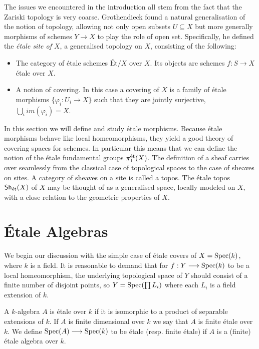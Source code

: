 The issues we encountered in the introduction all stem from the fact that the Zariski topology is very coarse. Grothendieck found a natural generalisation of the notion of topology, allowing not only open subsets $U \subseteq X$ but more generally morphisms of schemes $Y \to X$ to play the role of open set. Specifically, he defined the \textit{\'etale site of $X$}, a generalised topology on $X$, consisting of the following:

\begin{itemize}
  \item The category of \'etale schemes $\text{\'Et}/X$ over $X$. Its objects are schemes $f:S \to X$ \'etale over $X$. 
  \item A notion of covering. In this case a covering of $X$ is a family of \'etale morphisms $\{\varphi_i: U_i \to X\}$ such that they are jointly surjective, $\bigcup_i im(\varphi_i) = X$. 
\end{itemize}

In this section we will define and study \'etale morphisms.  Because \'etale morphisms behave like local homeomorphisms, they yield a good theory of covering spaces for schemes. In particular this means that we can define the notion of the \'etale fundamental groups $\pi_1^{\text{\'et}}(X)$. The definition of a sheaf carries over seamlessly from the classical case of topological spaces to the case of sheaves on sites. A category of sheaves on a site is called a topos.  The \'etale topos $\mathsf{Sh}_{\text{\'et}}(X)$ of $X$ may be thought of as a generalised space, locally modeled on $X$, with a close relation to the geometric properties of $X$. 

\section{\'Etale Algebras}
We begin our discussion with the simple case of \'etale covers of $X = \operatorname{Spec}(k)$, where $k$ is a field. It is reasonable to demand that for $f: Y \longrightarrow \operatorname{Spec}(k)$ to be a local homeomorphism, the underlying topological space of $Y$ should consist of a finite number of disjoint points, so $Y = \operatorname{Spec}(\prod L_i)$ where each $L_i$ is a field extension of $k$. 

\begin{definition}
  A $k$-algebra $A$ is \'etale over $k$ if it is isomorphic to a product of separable extensions of $k$. If $A$ is finite dimensional over $k$ we say that $A$ is finite \'etale over $k$. We define $\operatorname{Spec}(A) \longrightarrow \operatorname{Spec}(k)$ to be \'etale (resp. finite \'etale) if $A$ is a (finite) \'etale algebra over $k$.
\end{definition}

